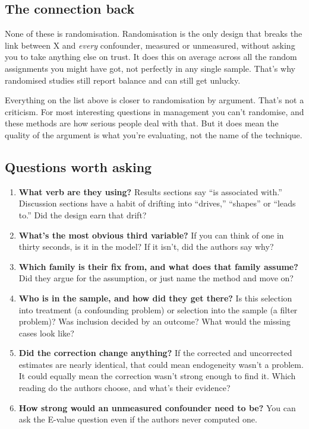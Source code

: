 \documentclass[
]{book}
\providecommand{\tightlist}{%
  \setlength{\itemsep}{0pt}\setlength{\parskip}{0pt}}
\begin{document}
\subsection{The connection back}\label{the-connection-back-2}

None of these is randomisation. Randomisation is the only design that breaks the link between X and \emph{every} confounder, measured or unmeasured, without asking you to take anything else on trust. It does this on average across all the random assignments you might have got, not perfectly in any single sample. That's why randomised studies still report balance and can still get unlucky.

Everything on the list above is closer to randomisation by argument. That's not a criticism. For most interesting questions in management you can't randomise, and these methods are how serious people deal with that. But it does mean the quality of the argument is what you're evaluating, not the name of the technique.

\subsection{Questions worth asking}\label{questions-worth-asking-2}

\begin{enumerate}
\def\labelenumi{\arabic{enumi}.}
\tightlist
\item
  \textbf{What verb are they using?} Results sections say ``is associated with.'' Discussion sections have a habit of drifting into ``drives,'' ``shapes'' or ``leads to.'' Did the design earn that drift?
\item
  \textbf{What's the most obvious third variable?} If you can think of one in thirty seconds, is it in the model? If it isn't, did the authors say why?
\item
  \textbf{Which family is their fix from, and what does that family assume?} Did they argue for the assumption, or just name the method and move on?
\item
  \textbf{Who is in the sample, and how did they get there?} Is this selection into treatment (a confounding problem) or selection into the sample (a filter problem)? Was inclusion decided by an outcome? What would the missing cases look like?
\item
  \textbf{Did the correction change anything?} If the corrected and uncorrected estimates are nearly identical, that could mean endogeneity wasn't a problem. It could equally mean the correction wasn't strong enough to find it. Which reading do the authors choose, and what's their evidence?
\item
  \textbf{How strong would an unmeasured confounder need to be?} You can ask the E-value question even if the authors never computed one.
\end{enumerate}
\end{document}
